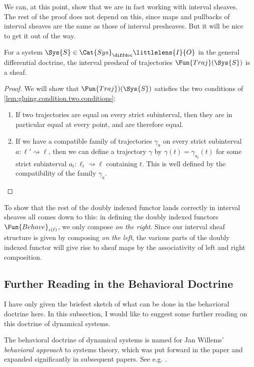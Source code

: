 \documentclass[DynamicalBook]{subfiles}
\begin{document}
  We can, at this point, show that we are in fact working with interval sheaves. The rest of the proof does not depend on this, since maps and pullbacks of interval sheaves are the same as those of interval presheaves. But it will be nice to get it out of the way.
  \begin{lemma}
  For a system $\Sys{S} \in \Cat{Sys}_{{\diffdoc}}\littlelens{I}{O}$ in the general differential doctrine, the interval presheaf of trajectories $\Fun{Traj}(\Sys{S})$ is a sheaf.
  \end{lemma}
  \begin{proof}
We will show that $\Fun{Traj})(\Sys{S})$ satisfies the two conditions of \cref{lem:gluing.condition.two.conditions}:
\begin{enumerate}
\item If two trajectories are equal on every strict subinterval, then they are in particular equal at every point, and are therefore equal.
\item If we have a compatible family of trajectories $\gamma_a$ on every strict subinterval $a : \ell' \rightsquigarrow \ell$, then we can define a trajectory $\gamma$ by $\gamma(t) = \gamma_{a_{t}}(t)$ for some strict subinterval $a_{t} : \ell_{t} \rightsquigarrow \ell$ containing $t$. This is well defined by the compatibility of the family $\gamma_{a}$.
        \end{enumerate}
  \end{proof}

To show that the rest of the doubly indexed functor lands correctly in interval sheaves all comes down to this: in defining the doubly indexed functors $\Fun{Behave}_{{\iota(\ell)}}$, we only compose \emph{on the right}. Since our interval sheaf structure is given by composing \emph{on the left}, the various parts of the doubly indexed functor will give rise to sheaf maps by the associativity of left and right composition.

\subsection{Further Reading in the Behavioral Doctrine}

I have only given the briefest sketch of what can be done in the behavioral doctrine here. In this subsection, I would like to suggest some further reading on this doctrine of dynamical systems.

The behavioral doctrine of dynamical systems is named for Jan Willems' \emph{behavioral approach} to systems theory, which was put forward in the paper \cite{Willems:first.paper} and expanded significantly in subsequent papers. See e.g. \cite{Willems:2007a, Willems.Polderman:2013a}.
\end{document}

